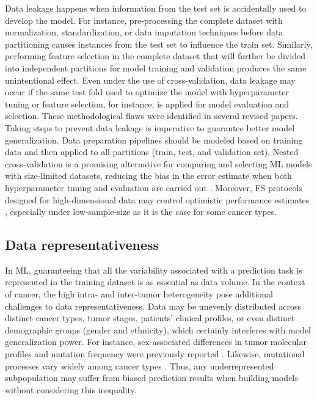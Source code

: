 Data leakage happens when information from the test set is accidentally used to develop the model.
For instance, pre-processing the complete dataset with normalization, standardization, or data imputation techniques before data partitioning causes instances from the test set to influence the train set. Similarly, performing feature selection in the complete dataset that will further be divided into independent partitions for model training and validation produces the same unintentional effect. Even under the use of cross-validation, data leakage may occur if the same test fold used to optimize the model with hyperparameter tuning or feature selection, for instance, is applied for model evaluation and selection. These methodological flaws were identified in several revised papers. Taking steps to prevent data leakage is imperative to guarantee better model generalization. Data preparation pipelines should be modeled based on training data and then applied to all partitions (\eg train, test, and validation set). 
Nested cross-validation is a promising alternative for comparing and selecting ML models with size-limited datasets, reducing the bias in the error estimate when both hyperparameter tuning and evaluation are carried out \cite{varma2006bias, vabalas2019machine}. Moreover, FS protocols designed for high-dimensional data may control optimistic performance estimates \cite{kuncheva2018feature}, especially under low-sample-size as it is the case for some cancer types.

\subsection{Data representativeness}

In ML, guaranteeing that all the variability associated with a prediction task is represented in the training dataset is as essential as data volume. In the context of cancer, the high intra- and inter-tumor heterogeneity pose additional challenges to data representativeness. Data may be unevenly distributed across distinct cancer types, tumor stages, patients' clinical profiles, or even distinct demographic groups (\eg gender and ethnicity), which certainly interferes with model generalization power. For instance, sex-associated differences in tumor molecular profiles and mutation frequency were previously reported \cite{li2018cr}. Likewise, mutational processes vary widely among cancer types \cite{brown2019finding}. Thus, any underrepresented subpopulation may suffer from biased prediction results when building models without considering this inequality. 

